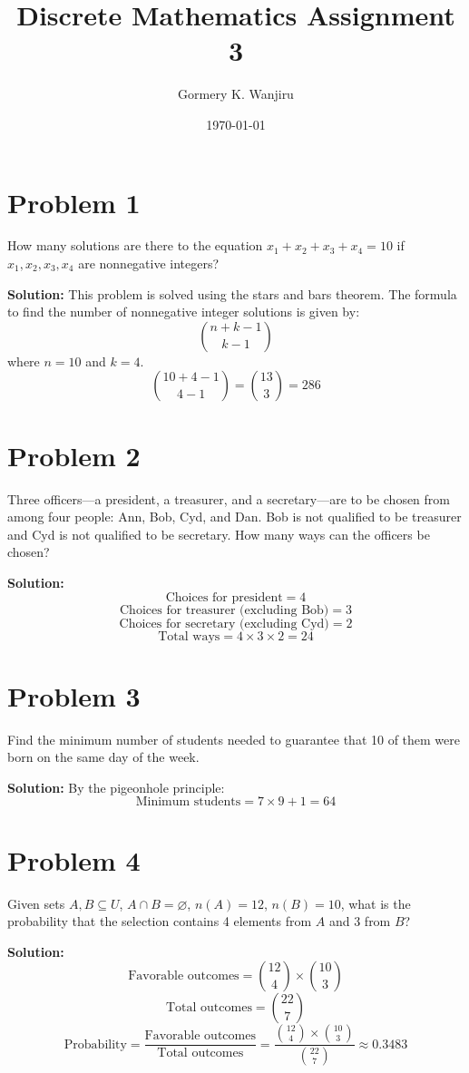 \documentclass[12pt]{article}
\title{Discrete Mathematics Assignment 3}
\author{Gormery K. Wanjiru}
\date{\today}
\begin{document}
\maketitle

\section*{Problem 1}
How many solutions are there to the equation \(x_1 + x_2 + x_3 + x_4 = 10\) if \(x_1, x_2, x_3, x_4\) are nonnegative integers?

\textbf{Solution:}
This problem is solved using the stars and bars theorem. The formula to find the number of nonnegative integer solutions is given by:
\[ \binom{n + k - 1}{k - 1} \]
where \(n = 10\) and \(k = 4\).
\[ \binom{10 + 4 - 1}{4 - 1} = \binom{13}{3} = 286 \]

\section*{Problem 2}
Three officers—a president, a treasurer, and a secretary—are to be chosen from among four people: Ann, Bob, Cyd, and Dan. Bob is not qualified to be treasurer and Cyd is not qualified to be secretary. How many ways can the officers be chosen?

\textbf{Solution:}
\[ \text{Choices for president} = 4 \]
\[ \text{Choices for treasurer (excluding Bob)} = 3 \]
\[ \text{Choices for secretary (excluding Cyd)} = 2 \]
\[ \text{Total ways} = 4 \times 3 \times 2 = 24 \]

\section*{Problem 3}
Find the minimum number of students needed to guarantee that 10 of them were born on the same day of the week.

\textbf{Solution:}
By the pigeonhole principle:
\[ \text{Minimum students} = 7 \times 9 + 1 = 64 \]

\section*{Problem 4}
Given sets \(A, B \subseteq U\), \(A \cap B = \varnothing\), \(n(A) = 12\), \(n(B) = 10\), what is the probability that the selection contains 4 elements from \(A\) and 3 from \(B\)?

\textbf{Solution:}
\[ \text{Favorable outcomes} = \binom{12}{4} \times \binom{10}{3} \]
\[ \text{Total outcomes} = \binom{22}{7} \]
\[ \text{Probability} = \frac{\text{Favorable outcomes}}{\text{Total outcomes}} = \frac{\binom{12}{4} \times \binom{10}{3}}{\binom{22}{7}} \approx 0.3483 \]
\end{document}
